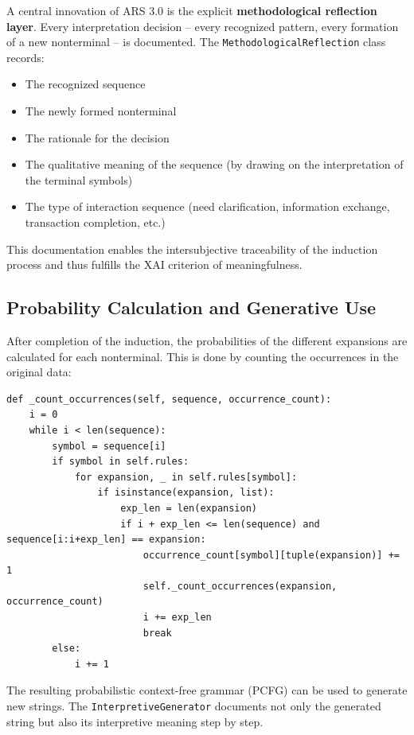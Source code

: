 \documentclass[
  12pt,
  a4paper,
  oneside,
  titlepage
]{article}
\begin{document}
A central innovation of ARS 3.0 is the explicit \textbf{methodological 
reflection layer}. Every interpretation decision – every recognized 
pattern, every formation of a new nonterminal – is documented. The 
\texttt{MethodologicalReflection} class records:

\begin{itemize}
    \item The recognized sequence
    \item The newly formed nonterminal
    \item The rationale for the decision
    \item The qualitative meaning of the sequence (by drawing on the 
    interpretation of the terminal symbols)
    \item The type of interaction sequence (need clarification, information 
    exchange, transaction completion, etc.)
\end{itemize}

This documentation enables the intersubjective traceability of the 
induction process and thus fulfills the XAI criterion of meaningfulness.

\subsection{Probability Calculation and Generative Use}

After completion of the induction, the probabilities of the different 
expansions are calculated for each nonterminal. This is done by counting 
the occurrences in the original data:

\begin{lstlisting}[caption=Counting Occurrences for Probabilities]
def _count_occurrences(self, sequence, occurrence_count):
    i = 0
    while i < len(sequence):
        symbol = sequence[i]
        if symbol in self.rules:
            for expansion, _ in self.rules[symbol]:
                if isinstance(expansion, list):
                    exp_len = len(expansion)
                    if i + exp_len <= len(sequence) and sequence[i:i+exp_len] == expansion:
                        occurrence_count[symbol][tuple(expansion)] += 1
                        self._count_occurrences(expansion, occurrence_count)
                        i += exp_len
                        break
        else:
            i += 1
\end{lstlisting}

The resulting probabilistic context-free grammar (PCFG) can be used to 
generate new strings. The \texttt{InterpretiveGenerator} documents not 
only the generated string but also its interpretive meaning step by step.
\end{document}
